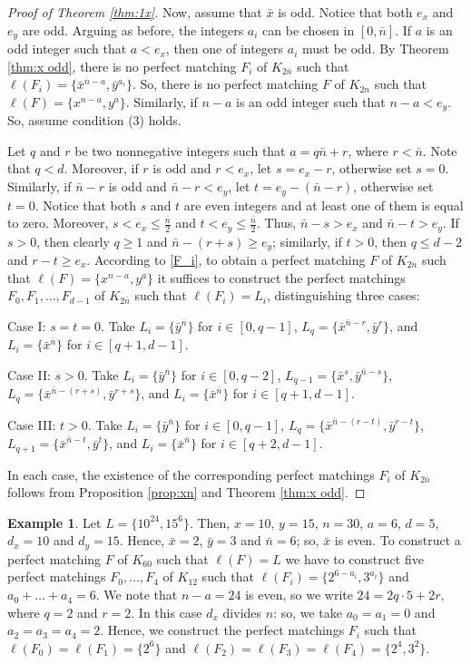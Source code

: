 \documentclass{amsart}
\theoremstyle{definition}
\newtheorem{ex}[defi]{Example}
\numberwithin{equation}{section}
\begin{document}
\begin{proof}[Proof of Theorem \ref{thm:1x}]
Now, assume that $\bar x$ is odd. Notice that both $e_x$ and $e_y$ are odd.
Arguing as before, the integers $a_i$ can be chosen in $[0,\bar n]$.
If $a$ is an odd integer such that $a < e_x$, then one of
integers $a_i$ must be odd. By Theorem \ref{thm:x odd}, there is no perfect matching $F_i$ of $K_{2\bar n}$
such that  $\ell(F_i)=\{{\bar x}^{\bar n-a}, {\bar y}^{a_i} \}$. So, there is no perfect matching $F$ of 
$K_{2n}$ such that $\ell(F)=\{x^{n-a},y^a\}$.
Similarly, if $n-a$ is an odd integer such that $n-a < e_y$.
So, assume condition (3) holds.


Let $q$ and $r$ be two nonnegative integers such that $a=q\bar{n}+r$, where $r<\bar{n}$.
Note that $q<d$. Moreover, if $r$ is odd and $r<e_x$, let $s=e_x-r$, otherwise set $s=0$.
Similarly, if $\bar{n}-r$ is odd and $\bar{n}-r<e_y$, let $t=e_y-(\bar{n}-r)$, otherwise set $t=0$.
Notice that both $s$ and $t$ are even integers and at least one of them is equal to zero.
Moreover, $s<e_x\leq \frac{\bar{n}}{2}$ and $t< e_y\leq\frac{\bar{n}}{2}$.
Thus, $\bar{n}-s>e_x$ and $\bar{n}-t> e_y$. 
If $s>0$, then clearly $q\geq 1$ and  $\bar{n}-(r+s) \geq e_y$;
similarly, if $t>0$, then $q\leq d-2$ and $r-t\geq e_x$.
According to \eqref{F_i}, to obtain a perfect matching $F$ of $K_{2n}$ such that  $\ell(F)=\{ x^{n-a}, y^a\}$ it suffices to construct 
the perfect matchings $F_0,F_1,\ldots, F_{d-1}$ of $K_{2\bar n}$ such that $\ell(F_i)=L_i$, distinguishing three cases:

\noindent Case I: $s=t=0$. Take $L_i=\{\bar{y}^{\bar{n}}\}$ for $i\in[0,q-1]$, 
$L_q=\{\bar{x}^{\bar{n}-r},\bar{y}^r\}$, and $L_i=\{\bar{x}^{\bar{n}}\}$ for $i\in[q+1,d-1]$.

\noindent Case II: $s>0$. Take $L_i=\{\bar{y}^{\bar{n}}\}$ for $i\in[0,q-2]$, 
$L_{q-1}=\{\bar{x}^{s},\bar{y}^{\bar{n}-s}\}$, $L_q=\{\bar{x}^{\bar{n}-(r+s)},\bar{y}^{r+s}\}$, 
and $L_i=\{\bar{x}^{\bar{n}}\}$ for $i\in[q+1,d-1]$.

\noindent Case III: $t>0$. Take $L_i=\{\bar{y}^{\bar{n}}\}$ for $i\in[0,q-1]$,
$L_q=\{\bar{x}^{\bar{n}-(r-t)},\bar{y}^{r-t}\}$, $L_{q+1}=\{\bar{x}^{\bar{n}-t},\bar{y}^{t}\}$, and $L_i=\{\bar{x}^{\bar{n}}\}$ for $i\in[q+2,d-1]$.

In each case, the existence of the corresponding perfect matchings $F_i$ of $K_{2\bar n}$ follows from Proposition \ref{prop:xn} and Theorem \ref{thm:x odd}.
\end{proof}


\begin{ex}
Let $L=\{10^{24}, 15^6\}$. Then, $x=10$, $y=15$, $n=30$, $a=6$, $d=5$, $d_x=10$ and $d_y=15$.
Hence, $\bar x=2$, $\bar y=3$ and $\bar n=6$; so, $\bar x$ is even.
To construct a perfect matching $F$ of $K_{60}$ such that $\ell(F)=L$ we have to construct 
five perfect matchings $F_0,\ldots, F_4$ of $K_{12}$
such that $\ell(F_i)=\{2^{6-a_i}, 3^{a_i}\}$ and $a_0+\ldots+a_4=6$.
We note that $n-a=24$ is even, so we write $24 = 2q\cdot 5 + 2r$, where $q=2$ and $r=2$.
In this case $d_x$ divides $n$: so, we take $a_0=a_1=0$ and $a_2=a_3=a_4=2$.
Hence, we construct the perfect matchings $F_i$ such that 
$\ell(F_0)=\ell(F_1)=\{2^6\}$ and $\ell(F_2)=\ell(F_3)=\ell(F_4)=\{2^4, 3^2\}$.
\end{ex}
\end{document}
